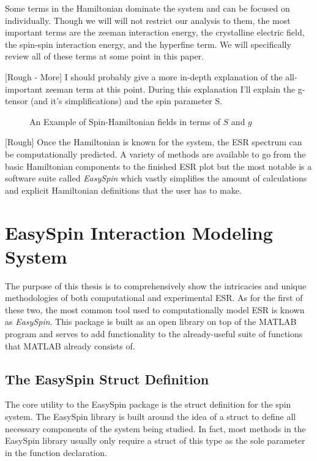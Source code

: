 \documentclass[oneside, astronomy, noacknowlegments]{BYUPhys}
\begin{document}
Some terms in the Hamiltonian dominate the system and can be focused on individually. Though we will will not restrict our analysis to them, the most important terms are the zeeman interaction energy, the crystalline electric field, the spin-spin interaction energy, and the hyperfine term. We will specifically review all of these terms at some point in this paper.

[Rough - More] I should probably give a more in-depth explanation of the all-important zeeman term at this point. During this explanation I'll explain the g-tensor (and it's simplifications) and the spin parameter S.

\begin{figure}
    \caption[Example of spin-hamiltonion fields]{\label{fig:HamFields}
     An Example of Spin-Hamiltonian fields in terms of $S$ and $g$}
 \end{figure}

[Rough] Once the Hamiltonian is known for the system, the ESR spectrum can be computationally predicted. A variety of methods are available to go from the basic Hamiltonian components to the finished ESR plot but the most notable is a software suite called \textit{EasySpin} which vastly simplifies the amount of calculations and explicit Hamiltonian definitions that the user has to make.

\section{EasySpin Interaction Modeling System}

The purpose of this thesis is to comprehensively show the intricacies and unique methodologies of both computational and experimental ESR. As for the first of these two, the most common tool used to computationally model ESR is known as \textit{EasySpin}. This package is built as an open library on top of the MATLAB program and serves to add functionality to the already-useful suite of functions that MATLAB already consists of.

\subsection{The EasySpin Struct Definition}

The core utility to the EasySpin package is the struct definition for the spin system. The EasySpin library is built around the idea of a struct to define all necessary components of the system being studied. In fact, most methods in the EasySpin library usually only require a struct of this type as the sole parameter in the function declaration.
\end{document}
